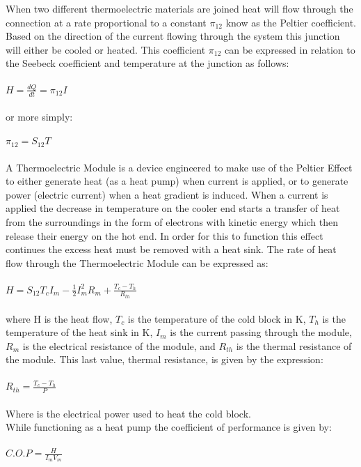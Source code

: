 \documentclass{article}
\begin{document}
When two different thermoelectric materials are joined heat will flow through the connection at a rate proportional to a constant $\pi_{12}$ know as the Peltier coefficient. Based on the direction of the current flowing through the system this junction will either be cooled or heated. This coefficient $\pi_{12}$ can be expressed in relation to the Seebeck coefficient and temperature at the junction as follows:\\\\
$H=\frac{dQ}{dt}=\pi_{12}I$\\\\
or more simply:\\\\
$\pi_{12}=S_{12}T$\\\\
A Thermoelectric Module is a device engineered to make use of the Peltier Effect to either generate heat (as a heat pump) when current is applied, or to generate power (electric current) when a heat gradient is induced. When a current is applied the decrease in temperature on the cooler end starts a transfer of heat from the surroundings in the form of electrons with kinetic energy which then release their energy on the hot end. In order for this to function this effect continues the excess heat must be removed with a heat sink. The rate of heat flow through the Thermoelectric Module can be expressed as:\\\\
$H=S_{12}T_cI_m-\frac{1}{2}I^2_mR_m+\frac{T_c-T_h}{R_{th}}$\\\\
where H is the heat flow, $T_c$ is the temperature of the cold block in K, $T_h$ is the temperature of the heat sink in K, $I_m$ is the current passing through the module, $R_m$ is the electrical resistance of the module, and $R_{th}$ is the thermal resistance of the module. This last value, thermal resistance, is given by the expression:\\\\
$R_{th}=\frac{T_c-T_h}{P}$\\\\
Where is the electrical power used to heat the cold block.\\
While functioning as a heat pump the coefficient of performance is given by:\\\\
$C.O.P=\frac{H}{I_mV_m}$\\
\end{document}
